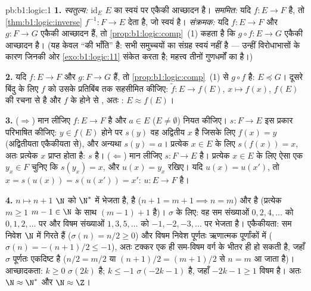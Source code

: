 \begin{solution}{pb:b1:logic:1}
\textbf{1.} \emph{स्वतुल्य:} $\mathrm{id}_E$ $E$ का स्वयं पर एकैकी आच्छादन
है। \emph{सममित:} यदि $f \colon E \to F$  है, तो
\cref{thm:b1:logic:inverse} $f^{-1} \colon F \to E$ देता है, जो स्वयं  है। \emph{संक्रमक:} यदि $f \colon E \to F$ और $g \colon F \to G$
एकैकी आच्छादन हैं, तो \cref{prop:b1:logic:comp}~(1) कहता है कि $g \circ f
\colon E \to G$ एकैकी आच्छादन है। (यह केवल  ``की भाँति'' है:
सभी समुच्चयों का संग्रह स्वयं  नहीं है --- उन्हीं विरोधाभासों के कारण
जिनकी ओर \cref{exo:b1:logic:11} संकेत करता है; महत्त्व तीनों गुणधर्मों का
है।)

\textbf{2.} यदि $f \colon E \to F$ और $g \colon F \to G$  हैं, तो
\cref{prop:b1:logic:comp}~(1) से $g \circ f$  है: $E \preceq G$। दूसरे
बिंदु के लिए $f$ को उसके प्रतिबिंब तक सहसीमित कीजिए:  $\tilde f
\colon E \to f(E)$, $x \mapsto f(x)$, $f(E)$ की रचना से  है और $f$ के
 होने से , अतः : $E \approx f(E)$।

\textbf{3.} ($\Rightarrow$) मान लीजिए $f \colon E \to F$  है और $a \in
E$ ($E \neq \emptyset$) नियत कीजिए। $s \colon F \to E$ इस प्रकार परिभाषित
कीजिए: $y \in f(E)$ होने पर $s(y)$ वह अद्वितीय $x$ है जिसके लिए $f(x) = y$
(अद्वितीयता एकैकीयता से), और अन्यथा $s(y) = a$। प्रत्येक $x \in E$ के लिए
$s(f(x)) = x$, अतः प्रत्येक $x$ प्राप्त होता है: $s$  है।
($\Leftarrow$) मान लीजिए $s \colon F \to E$  है। प्रत्येक $x \in E$
के लिए ऐसा एक $y_x \in F$ चुनिए कि $s(y_x) = x$, और $u(x) = y_x$ रखिए। यदि
$u(x) = u(x')$, तो $x = s(u(x)) = s(u(x')) = x'$: $u \colon E \to F$ 
है।

\textbf{4.} $n \mapsto n + 1$ $\N$ को $\N^*$ में भेजता है,  है ($n + 1
= m + 1 \implies n = m$) और  है (प्रत्येक $m \geq 1$ $m - 1 \in \N$
के साथ $(m - 1) + 1$ है)। $\sigma$ के लिए: वह सम संख्याओं $0, 2, 4, \dots$
को $0, 1, 2, \dots$ पर और विषम संख्याओं $1, 3, 5, \dots$ को $-1, -2, -3,
\dots$ पर भेजता है। एकैकीयता: सम निवेश $\N$ में गिरते हैं ($\sigma(n) = n/2
\geq 0$) और विषम निवेश पूर्णतः ऋणात्मक पूर्णांकों में ($\sigma(n) = -(n+1)/2
\leq -1$), अतः टक्कर एक ही सम-विषम वर्ग के भीतर ही हो सकती है, जहाँ $\sigma$
पूर्णतः एकदिष्ट है ($n/2 = m/2$ या $(n+1)/2 = (m+1)/2$ से $n = m$ आ जाता
है)। आच्छादकता: $k \geq 0$ $\sigma(2k)$ है; $k \leq -1$ $\sigma(-2k - 1)$
है, जहाँ $-2k - 1 \geq 1$ विषम है। अतः $\N \approx \N^*$ और $\N \approx \Z$।


\end{solution}
